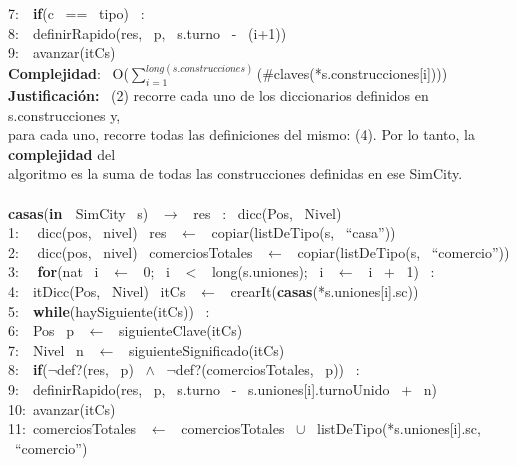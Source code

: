 \begin{Algoritmos}
    7:\indent \indent  \  \ \textbf{if}(c \ == \ tipo) \ :\\
    8:\indent \indent \indent  \  \ definirRapido(res, \ p, \ s.turno \ - \ (i+1))\\
    9:\indent \indent  \  \ avanzar(itCs) \ \\
    \textbf{Complejidad}: \ O($\sum_{i=1}^{long(s.construcciones)}$($ \# $claves(*s.construcciones[i])))\\
    \textbf{Justificaci\'on:} \ (2) recorre cada uno de los diccionarios definidos en s.construcciones y,\\
    para cada uno, recorre todas las definiciones del mismo: (4). Por lo tanto, la \textbf{complejidad} del\\
    algoritmo es la suma de todas las construcciones definidas en ese SimCity.\\
    \makebox[\linewidth]{\rule{\textwidth}{0.4pt}}
    \\
    \makebox[\linewidth]{\rule{\textwidth}{0.4pt}}
    \textbf{casas}(\textbf{in \ }SimCity \ s) \ $\rightarrow $ \ res \ : \ dicc(Pos, \ Nivel)\\
    1: \  \ dicc(pos, \ nivel) \ res \ $\leftarrow$ \ copiar(listDeTipo(s, \ ``casa''))\\
    2: \  \ dicc(pos, \ nivel) \ comerciosTotales \ $\leftarrow$ \ copiar(listDeTipo(s, \ ``comercio''))\\
    3: \  \ \textbf{for}(nat \ i \ $\leftarrow$ \ 0; \ i \ $<$ \ long(s.uniones); \ i \ $\leftarrow$ \ i \ + \ 1) \ : \ \\
    4:\indent  \  \ itDicc(Pos, \ Nivel) \ itCs \ $\leftarrow$ \ crearIt(\textbf{casas}(*s.uniones[i].sc))\\
    5:\indent  \  \ \textbf{while}(haySiguiente(itCs)) \ :\\
    6:\indent \indent  \  \ Pos \ p \ $\leftarrow$ \ siguienteClave(itCs)\\
    7:\indent \indent  \  \ Nivel \ n \ $\leftarrow$ \ siguienteSignificado(itCs)\\
    8:\indent \indent  \  \ \textbf{if}($\neg$def?(res, \ p) \ $\wedge$ \ $\neg$def?(comerciosTotales, \ p)) \ :\\
    9:\indent \indent \indent  \  \ definirRapido(res, \ p, \ s.turno \ - \ s.uniones[i].turnoUnido \ + \ n)\\
    10:\indent \indent  \ avanzar(itCs)\\
    11:\indent  \ comerciosTotales \ $\leftarrow$ \ comerciosTotales \ $\cup$ \ listDeTipo(*s.uniones[i].sc, \ ``comercio'')\\

\end{Algoritmos}
